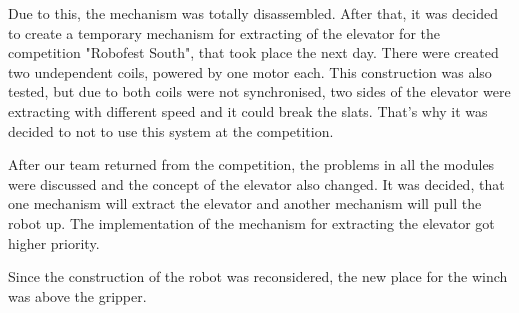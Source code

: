 \begin{enumerate*}
  Due to this, the mechanism was totally disassembled. After that, it was decided to create a temporary mechanism for extracting of the elevator for the competition "Robofest South", that took place the next day. There were created two undependent coils, powered by one motor each. This construction was also tested, but due to both coils were not synchronised, two sides of the elevator were extracting with different speed and it could break the slats. That's why it was decided to not to use this system at the competition.

  After our team returned from the competition, the problems in all the modules were discussed and the concept of the elevator also changed.
  It was decided, that one mechanism will extract the elevator and another mechanism will pull the robot up. The implementation of the mechanism for extracting the elevator got higher priority.

  Since the construction of the robot was reconsidered, the new place for the winch was above the gripper.


\end{enumerate*}
